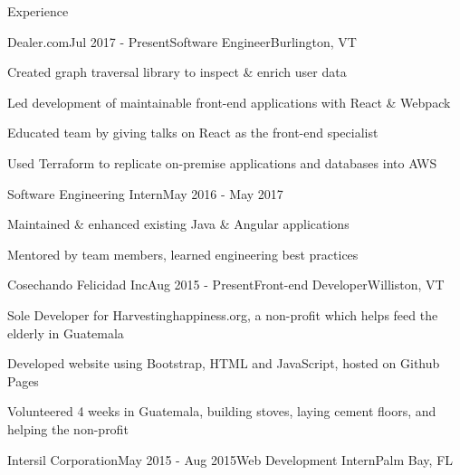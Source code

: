\documentclass{resume} %
\begin{document}

\begin{rSection}{Experience}


\begin{rSubsection}{Dealer.com}{Jul 2017 - Present}{Software Engineer}{Burlington, VT}
\item Created graph traversal library to inspect \& enrich user data
\item Led development of maintainable front-end applications with React \& Webpack
\item Educated team by giving talks on React as the front-end specialist
\item Used Terraform to replicate on-premise applications and databases into AWS
\end{rSubsection}
\begin{sSubsection}{Software Engineering Intern}{May 2016 - May 2017}
\item Maintained \& enhanced existing Java \& Angular applications
\item Mentored by team members, learned engineering best practices
\end{sSubsection}

\begin{rSubsection}{Cosechando Felicidad Inc}{Aug 2015 - Present}{Front-end Developer}{Williston, VT}

\item Sole Developer for Harvestinghappiness.org, a non-profit which helps feed the elderly in Guatemala
\item Developed website using Bootstrap, HTML and JavaScript, hosted on Github Pages
\item Volunteered 4 weeks in Guatemala, building stoves, laying cement floors, and helping the non-profit

\end{rSubsection}


\begin{rSubsection}{Intersil Corporation}{May 2015 - Aug 2015}{Web Development Intern}{Palm Bay, FL}


\end{rSubsection}
\end{rSection}
\end{document}
